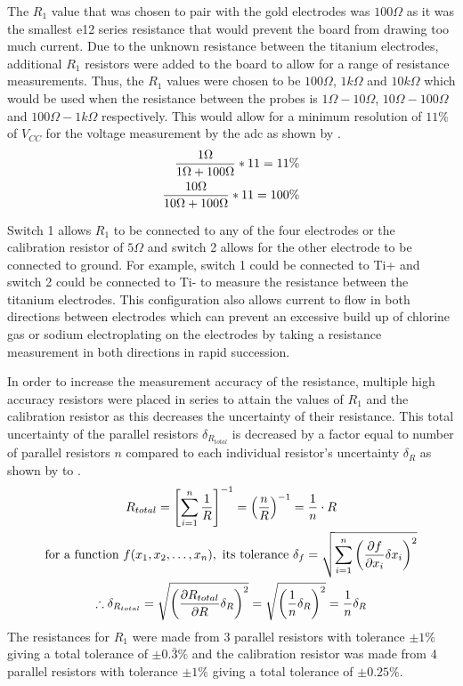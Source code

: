 The $R_1$ value that was chosen to pair with the gold electrodes was $100\Omega$ as it was the smallest e12 series resistance that would prevent the board from drawing too much current.
Due to the unknown resistance between the titanium electrodes, additional $R_1$ resistors were added to the board to allow for a range of resistance measurements.
Thus, the $R_1$ values were chosen to be $100\Omega$, $1k\Omega$ and $10k\Omega$ which would be used when the resistance between the probes is $1\Omega - 10\Omega$, $10\Omega - 100\Omega$ and $100\Omega - 1k\Omega$ respectively.
This would allow for a minimum resolution of $11\%$ of $V_{CC}$ for the voltage measurement by the \gls{adc} as shown by .
\begin{align}\label{eqn:adc-resolution}
    \frac{\displaystyle 1\Omega}{\displaystyle 1\Omega + 100\Omega} * 11 = 11\% \\
    \frac{\displaystyle 10\Omega}{\displaystyle 10\Omega + 100\Omega} * 11 = 100\%
\end{align} 

Switch 1 allows $R_1$ to be connected to any of the four electrodes or the calibration resistor of $5\Omega$ and switch 2 allows for the other electrode to be connected to ground.
For example, switch 1 could be connected to Ti+ and switch 2 could be connected to Ti- to measure the resistance between the titanium electrodes.
This configuration also allows current to flow in both directions between electrodes which can prevent an excessive build up of chlorine gas or sodium electroplating on the electrodes by taking a resistance measurement in both directions in rapid succession.

In order to increase the measurement accuracy of the resistance, multiple high accuracy resistors were placed in series to attain the values of $R_1$ and the calibration resistor as this decreases the uncertainty of their resistance.
This total uncertainty of the parallel resistors $\delta_{R_{total}}$ is decreased by a factor equal to number of parallel resistors $n$ compared to each individual resistor's uncertainty $\delta_R$ as shown by  to .
\begin{gather}
    R_{total} = {\left[ \sum_{i=1}^{n} \frac{\displaystyle 1}{\displaystyle R} \right]}^{-1} = {\left(\frac{\displaystyle n}{\displaystyle R}\right)}^{-1} = \frac{\displaystyle 1}{\displaystyle n}\cdot R \label{eqn:parallel-resistor-total} \\
    \text{for a function}~f(x_1,x_2,\dots,x_n),~\text{its tolerance} ~\delta_f = \sqrt{\sum_{i=1}^{n} {\left( \frac{\displaystyle \partial f}{\displaystyle \partial x_i} \delta x_i \right)}^2} \label{eqn:uncertainty-general-formula} \\
    \therefore \delta_{R_{total}} = \sqrt{{\left( \frac{\displaystyle \partial R_{total}}{\displaystyle \partial R} \delta_R \right)}^2} = \sqrt{{\left( \frac{\displaystyle 1}{\displaystyle n} \delta_R \right)}^2} = \frac{\displaystyle 1}{\displaystyle n} \delta_R \label{eqn:parallel-resistor-uncertainty}
\end{gather}
The resistances for $R_1$ were made from 3 parallel resistors with tolerance $\pm1\%$ giving a total tolerance of $\pm0.\bar{3}\%$ and the calibration resistor was made from 4 parallel resistors with tolerance $\pm1\%$ giving a total tolerance of $\pm0.25\%$.

